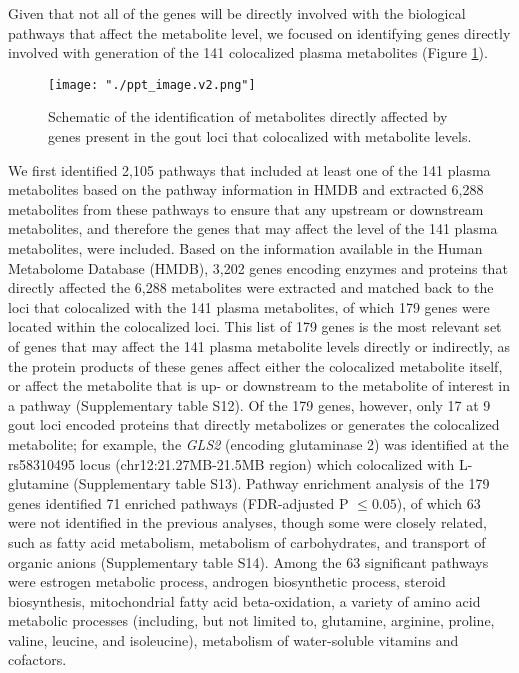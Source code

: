 \documentclass[a4paper,10pt]{article}
\begin{document}
Given that not all of the genes will be directly involved with the biological pathways that affect the metabolite level, we focused on identifying genes directly involved with generation of the 141 colocalized plasma metabolites (Figure \ref{fig:met_assoc_w_loci}).
\begin{figure}[b!]
	\centering
	\texttt{[image: "./ppt\_image.v2.png"]}
	\caption{Schematic of the identification of metabolites directly affected by genes present in the gout loci that colocalized with metabolite levels.}
	\label{fig:met_assoc_w_loci}
\end{figure}
We first identified 2,105 pathways that included at least one of the 141 plasma metabolites based on the pathway information in HMDB and extracted 6,288 metabolites from these pathways to ensure that any upstream or downstream metabolites, and therefore the genes that may affect the level of the 141 plasma metabolites, were included.
Based on the information available in the Human Metabolome Database (HMDB), 3,202 genes encoding enzymes and proteins that directly affected the 6,288 metabolites were extracted and matched back to the loci that colocalized with the 141 plasma metabolites, of which 179 genes were located within the colocalized loci.
This list of 179 genes is the most relevant set of genes that may affect the 141 plasma metabolite levels directly or indirectly, as the protein products of these genes affect either the colocalized metabolite itself, or affect the metabolite that is up- or downstream to the metabolite of interest in a pathway (Supplementary table S12).
Of the 179 genes, however, only 17 at 9 gout loci encoded proteins that directly metabolizes or generates the colocalized metabolite; for example, the \textit{GLS2} (encoding glutaminase 2) was identified at the rs58310495 locus (chr12:21.27MB-21.5MB region) which colocalized with L-glutamine (Supplementary table S13).
Pathway enrichment analysis of the 179 genes identified 71 enriched pathways (FDR-adjusted P $\le 0.05$), of which 63 were not identified in the previous analyses, though some were closely related, such as fatty acid metabolism, metabolism of carbohydrates, and transport of organic anions (Supplementary table S14).
Among the 63 significant pathways were estrogen metabolic process, androgen biosynthetic process, steroid biosynthesis, mitochondrial fatty acid beta-oxidation, a variety of amino acid metabolic processes (including, but not limited to, glutamine, arginine, proline, valine, leucine, and isoleucine), metabolism of water-soluble vitamins and cofactors.
\\
\end{document}
